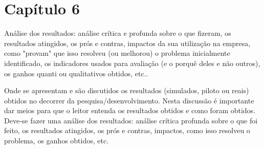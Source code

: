 \chapter{Capítulo 6}

Análise  dos  resultados:  análise  crítica  e  profunda  sobre  o  que fizeram,  os  resultados atingidos,  os  prós  e  contras,  impactos  da sua  utilização  na  empresa,  como  "provam"  que  isso resolveu  (ou  melhorou)  o  problema  inicialmente  identificado,  os  indicadores usados  para avaliação (e o porquê deles e não outros), os ganhos quanti ou qualitativos obtidos, etc..


Onde se apresentam e são discutidos os resultados (simulados, piloto ou reais) obtidos no decorrer da pesquisa/desenvolvimento. 
Nesta discussão é importante dar meios para que o leitor entenda os resultados obtidos e como foram obtidos.
Deve-se fazer uma análise dos resultados: análise crítica profunda sobre o que foi feito, os resultados atingidos, os prós e contras, impactos, como isso resolveu o problema, os ganhos obtidos, etc.
